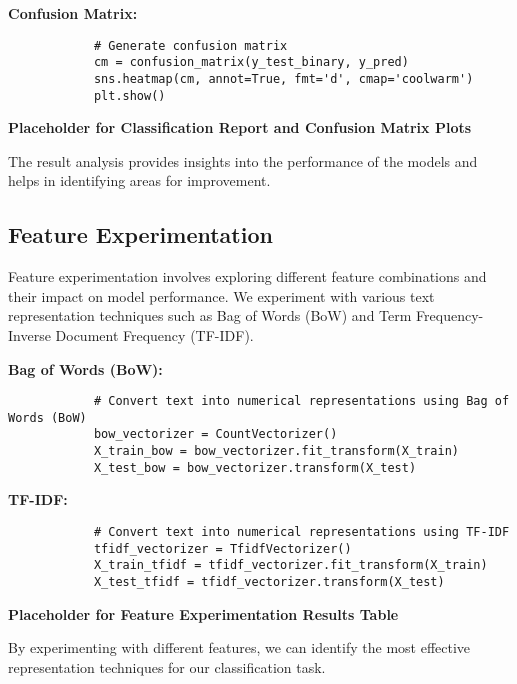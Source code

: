         \textbf{Confusion Matrix:}

        \begin{verbatim}
            # Generate confusion matrix
            cm = confusion_matrix(y_test_binary, y_pred)
            sns.heatmap(cm, annot=True, fmt='d', cmap='coolwarm')
            plt.show()
        \end{verbatim}

        \textbf{Placeholder for Classification Report and Confusion Matrix Plots}

        The result analysis provides insights into the performance of the models and helps in identifying areas for improvement.
            
    \subsection{Feature Experimentation}
    
        Feature experimentation involves exploring different feature combinations and their impact on model performance. We experiment with various text representation techniques such as Bag of Words (BoW) and Term Frequency-Inverse Document Frequency (TF-IDF).

        \textbf{Bag of Words (BoW):}

        \begin{verbatim}
            # Convert text into numerical representations using Bag of Words (BoW)
            bow_vectorizer = CountVectorizer()
            X_train_bow = bow_vectorizer.fit_transform(X_train)
            X_test_bow = bow_vectorizer.transform(X_test)
        \end{verbatim}

        \textbf{TF-IDF:}

        \begin{verbatim}
            # Convert text into numerical representations using TF-IDF
            tfidf_vectorizer = TfidfVectorizer()
            X_train_tfidf = tfidf_vectorizer.fit_transform(X_train)
            X_test_tfidf = tfidf_vectorizer.transform(X_test)
        \end{verbatim}

        \textbf{Placeholder for Feature Experimentation Results Table}

        By experimenting with different features, we can identify the most effective representation techniques for our classification task.
